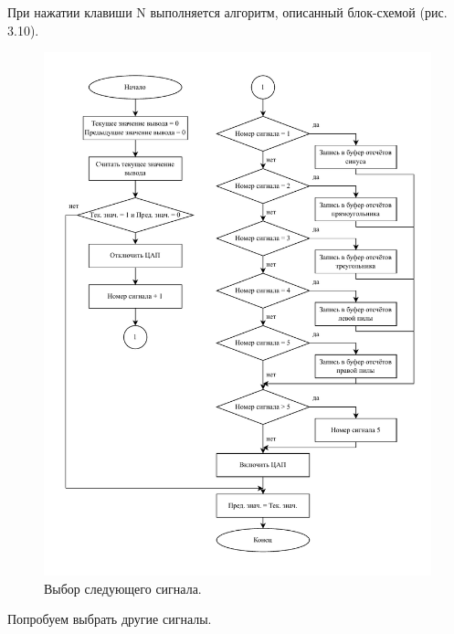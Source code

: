 	При нажатии клавиши N выполняется алгоритм, описанный блок-схемой (рис. 3.10).
	
	\begin{figure}[H]
    \centering
    \includegraphics[width=1\textwidth]{../image/plus_signal.pdf}
    \caption{Выбор следующего сигнала.}
	\end{figure}	
	
	Попробуем выбрать другие сигналы.
	
